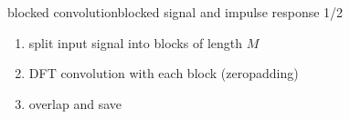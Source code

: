 	\begin{frame}{blocked convolution}{blocked signal and impulse response 1/2}
		\begin{enumerate}
			\item	split input signal into blocks of length $M$
			\item	DFT convolution with each block (zeropadding)
			\item	overlap and save
		\end{enumerate}
\end{frame}
